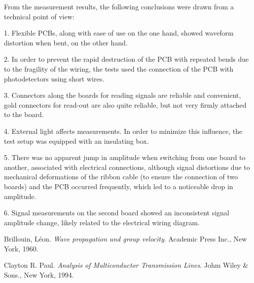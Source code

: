 \documentclass[../BTOF_summary.tex]{subfiles}
\begin{document}
From the measurement results, the following conclusions were drawn from a technical point of view:

1. Flexible PCBs, along with ease of use on the one hand, showed waveform distortion when bent, on the other hand.

2. In order to prevent the rapid destruction of the PCB with repeated bends due to the fragility of the wiring, the tests used the connection of the PCB with photodetectors using short wires.

3. Connectors along the boards for reading signals are reliable and convenient, gold connectors for read-out are also quite reliable, but not very firmly attached to the board.

4. External light affects measurements. In order to minimize this influence, the test setup was equipped with an insulating box.

5. There was no apparent jump in amplitude when switching from one board to another, associated with electrical connections, although signal distortions due to mechanical deformations of the ribbon cable (to ensure the connection of two boards) and the PCB occurred frequently, which led to a noticeable drop in amplitude.

6. Signal measurements on the second board showed an inconsistent signal amplitude change, likely related to the electrical wiring diagram.

\begin{thebibliography}{9}
Brillouin, Léon. 
\textit{Wave propagation and group velocity}. 
Academic Press Inc., New York, 1960.

Clayton R. Paul. 
\textit{Analysis of Multiconductor Transmission Lines}. 
Johm Wiley \& Sons., New York, 1994.

\end{thebibliography}
\end{document}
